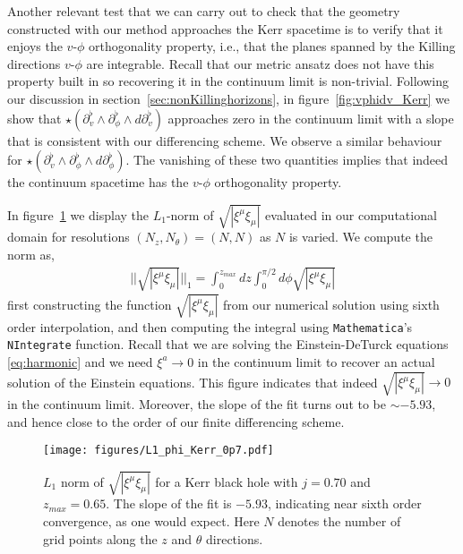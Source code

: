 \documentclass[12pt]{article}
\numberwithin{equation}{section}
\begin{document}
Another relevant test that we can carry out to check that the geometry constructed with our method approaches the Kerr spacetime is to verify that it enjoys the $v$-$\phi$ orthogonality property, i.e., that the planes spanned by the Killing directions $v$-$\phi$ are integrable. Recall that our metric ansatz does not have this property built in so recovering it in the continuum limit is non-trivial.  Following our discussion in section~\ref{sec:nonKillinghorizons}, in figure~\ref{fig:vphidv_Kerr} we show that $\star (\partial_v^\flat\wedge \partial_\phi^\flat\wedge d\partial_v^\flat)$ approaches zero in the continuum limit with a slope that is consistent with our differencing scheme. We observe a similar behaviour for $\star (\partial_v^\flat\wedge \partial_\phi^\flat\wedge d\partial_\phi^\flat)$. The vanishing of these two quantities implies that indeed the continuum spacetime has the $v$-$\phi$ orthogonality property. 


In figure~\ref{fig:phimax_kerr} we display the $L_1$-norm of $\sqrt{|\xi^\mu\xi_\mu|}$ evaluated in our computational domain for resolutions $(N_z, N_\theta) = (N,N)$ as $N$ is varied. We compute the norm as,
\begin{eqnarray}
|| \sqrt{|\xi^\mu\xi_\mu|} ||_1 = \int_0^{z_{max}} dz \int_0^{\pi/2} d\phi \sqrt{|\xi^\mu\xi_\mu|}
\end{eqnarray}
first constructing the function $\sqrt{|\xi^\mu\xi_\mu|}$ from our numerical solution using sixth order interpolation, and then computing the integral using {\tt Mathematica}'s \texttt{NIntegrate} function. Recall that we are solving the Einstein-DeTurck equations \eqref{eq:harmonic} and we need $\xi^a\to 0$ in the continuum limit to recover an actual solution of the Einstein equations. This figure indicates that indeed $\sqrt{|\xi^\mu\xi_\mu|}\to 0$ in the continuum limit. Moreover, the slope of the fit turns out to be $\sim -5.93$, and hence close to the order of our finite differencing scheme. 


\begin{figure}[t]
\centering
\texttt{[image: figures/L1\_phi\_Kerr\_0p7.pdf]}
\caption{$L_1$ norm of $\sqrt{|\xi^\mu\xi_\mu|}$ for a Kerr black hole with $j=0.70$ and $z_{max}=0.65$. The slope of the fit is $-5.93$, indicating near sixth order convergence, as one would expect. Here $N$ denotes the number of grid points along the $z$ and $\theta$ directions.}
\label{fig:phimax_kerr}
\end{figure}
\end{document}
